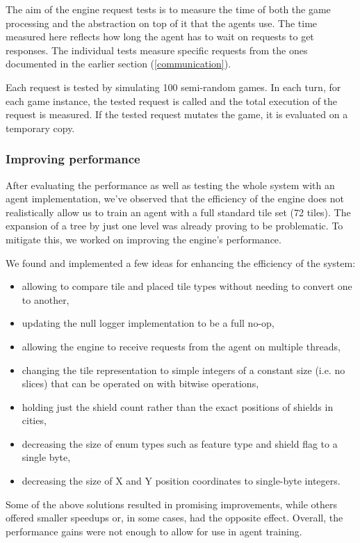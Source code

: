 The aim of the engine request tests is to measure the time of both the game processing
and the abstraction on top of it that the agents use. The time measured here reflects
how long the agent has to wait on requests to get responses. The individual tests measure
specific requests from the ones documented in the earlier section (\ref{communication}).

Each request is tested by simulating 100 semi-random games. In each turn, for each game instance,
the tested request is called and the total execution of the request is measured.
If the tested request mutates the game, it is evaluated on a temporary copy.

\subsubsection{Improving performance}

After evaluating the performance as well as testing the whole system with
an agent implementation, we've observed that the efficiency of the engine does not
realistically allow us to train an agent with a full standard tile set (72 tiles).
The expansion of a tree by just one level was already proving to be problematic.
To mitigate this, we worked on improving the engine's performance.

We found and implemented a few ideas for enhancing the efficiency of the system:
\begin{itemize}
	\item allowing to compare tile and placed tile types without needing to convert one to another,
    \item updating the null logger implementation to be a full no-op,
    \item allowing the engine to receive requests from the agent on multiple threads,
    \item changing the tile representation to simple integers of a constant size (i.e. no slices)
          that can be operated on with bitwise operations,
    \item holding just the shield count rather than the exact positions of shields in cities,
    \item decreasing the size of enum types such as feature type and shield flag to a single byte,
    \item decreasing the size of X and Y position coordinates to single-byte integers.
\end{itemize}
Some of the above solutions resulted in promising improvements,
while others offered smaller speedups or, in some cases, had the opposite effect.
Overall, the performance gains were not enough to allow for use in agent training.

